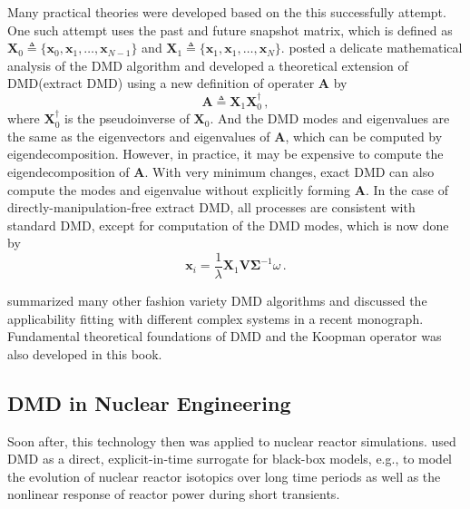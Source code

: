 Many practical theories were developed based on the this successfully attempt.
One such attempt uses the past and future snapshot matrix, which is defined as $\mathbf{X}_0 \triangleq \{\mathbf{x}_0, \mathbf{x}_1, \ldots, \mathbf{x}_{N-1} \}$ and $\mathbf{X}_1 \triangleq \{\mathbf{x}_1, \mathbf{x}_1, \ldots, \mathbf{x}_{N} \} $. 
\citet{tu_dynamic_2014} posted a delicate mathematical analysis of the DMD algorithm and developed a theoretical extension of DMD(extract DMD) using a new definition of operater $\mathbf{A}$ by    
\begin{equation}
 \mathbf{A}\triangleq \mathbf{X}_1  \mathbf{X}_0^{\dagger}\, ,
 \label{eq:exact_dmd}
\end{equation}
where $\mathbf{X}_0^{\dagger}$ is the pseudoinverse of $\mathbf{X}_0$. And the DMD modes and
eigenvalues are the same as the eigenvectors and eigenvalues of $\mathbf{A}$, which can be computed by eigendecomposition.
However, in practice, it may be expensive to compute the eigendecomposition of $\mathbf{A}$.
With very minimum changes, exact DMD can also compute the modes and eigenvalue without explicitly forming $\mathbf{A}$.
In the case of directly-manipulation-free extract DMD, all processes are consistent with standard DMD, except for computation of the DMD modes, which is now done by
\begin{equation}
 \mathbf{\mathbf{x}}_i = \frac{1}{\lambda} \mathbf{X}_1 \mathbf{V} \mathbf{\Sigma}^{-1} \omega \, .
 \label{eq:exact_dmd_free}
\end{equation}

\citet{kutz_dynamic_2016} summarized many other fashion variety DMD algorithms and discussed the applicability fitting with different complex systems in a recent monograph.
Fundamental theoretical foundations of DMD and the Koopman operator was also developed in this book.

\subsection{DMD in Nuclear Engineering}
Soon after, this technology then was applied to nuclear reactor simulations. 
\citet{abdo_data-driven_2018} used DMD as a direct, explicit-in-time surrogate for black-box models, e.g., to model the evolution of nuclear reactor isotopics over long time periods as well as the nonlinear response of reactor power during short transients.\cite{abdo_modeling_2019}\cite{elzohery2018comparison}


